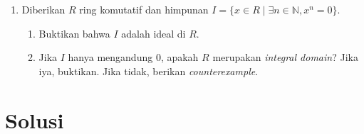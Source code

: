 \documentclass[11pt, a4paper]{article}
\begin{document}
\begin{enumerate}[leftmargin=*, label=\arabic*.]
  \item Diberikan $R$ ring komutatif dan himpunan $I = \{x \in R \mid \exists n \in \mathbb{N}, x^n = 0\}$.
        \begin{enumerate}[label=(\alph*)]
          \item Buktikan bahwa $I$ adalah ideal di $R$.
          \item Jika $I$ hanya mengandung $0$, apakah $R$ merupakan \textit{integral domain}? Jika iya, buktikan. Jika tidak, berikan \textit{counterexample}.
        \end{enumerate}
\end{enumerate}

\newpage
\section*{Solusi}
\end{document}
